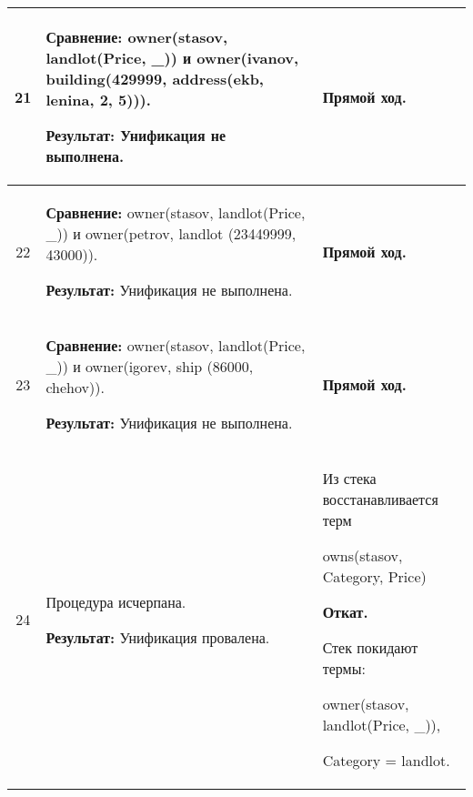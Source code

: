 \begin{longtable}{|c|p{}|p{}|}
21
                       &
\textbf{Сравнение:}\newline
  owner(stasov, landlot(Price, \_))
  \newline{}и\newline
  owner(ivanov, building(429999,   address(ekb, lenina, 2,  5))).
  \newline

  \textbf{Результат:}\newline
  Унификация не выполнена.
                       &
  \textbf{Прямой ход.}
                       \\ \hline

22
                       &
\textbf{Сравнение:}\newline
  owner(stasov, landlot(Price, \_))
  \newline{}и\newline
  owner(petrov, landlot (23449999, 43000)).
  \newline

  \textbf{Результат:}\newline
  Унификация не выполнена.
                       &
  \textbf{Прямой ход.}
                       \\ \hline

23
                       &
\textbf{Сравнение:}\newline
  owner(stasov, landlot(Price, \_))
  \newline{}и\newline
  owner(igorev, ship    (86000,    chehov)).
  \newline

  \textbf{Результат:}\newline
  Унификация не выполнена.
                       &
  \textbf{Прямой ход.}
                       \\ \hline

24
                       &
  Процедура исчерпана.

  \textbf{Результат:}\newline
  Унификация провалена.
                       &
  Из стека восстанавливается терм

  owns(stasov, Category, Price)
  \newline

  \textbf{Откат.}
  \newline

  Стек покидают термы:

    owner(stasov, landlot(Price, \_)),

    Category = landlot.
                       \\ \hline


\end{longtable}
